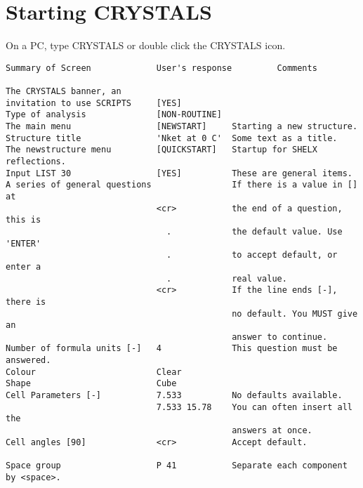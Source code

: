 \documentclass[10pt,a4paper]{report}
\begin{document}
\section{Starting CRYSTALS}


 On a PC, type CRYSTALS or double click the CRYSTALS icon.



\small\begin{verbatim}
Summary of Screen             User's response         Comments

The CRYSTALS banner, an
invitation to use SCRIPTS     [YES]
Type of analysis              [NON-ROUTINE]
The main menu                 [NEWSTART]     Starting a new structure.
Structure title               'Nket at 0 C'  Some text as a title.
The newstructure menu         [QUICKSTART]   Startup for SHELX reflections.
Input LIST 30                 [YES]          These are general items.
A series of general questions                If there is a value in [] at
                              <cr>           the end of a question, this is
                                .            the default value. Use 'ENTER'
                                .            to accept default, or enter a
                                .            real value.
                              <cr>           If the line ends [-], there is
                                             no default. You MUST give an
                                             answer to continue.
Number of formula units [-]   4              This question must be answered.
Colour                        Clear
Shape                         Cube
Cell Parameters [-]           7.533          No defaults available.
                              7.533 15.78    You can often insert all the
                                             answers at once.
Cell angles [90]              <cr>           Accept default.

Space group                   P 41           Separate each component by <space>.


\end{verbatim}
\end{document}
